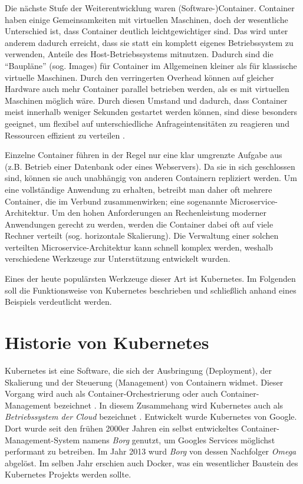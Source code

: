 \documentclass[11pt,a4paper]{article}
\begin{document}
Die nächste Stufe der Weiterentwicklung waren (Software-)Container. Container haben einige Gemeinsamkeiten mit virtuellen Maschinen, doch der wesentliche Unterschied ist,
dass Container deutlich leichtgewichtiger sind. Das wird unter anderem dadurch erreicht, dass sie statt ein komplett eigenes Betriebssystem zu verwenden, 
Anteile des Host-Betriebssystems mitnutzen. Dadurch sind die ``Baupläne'' (sog. Images) für Container im Allgemeinen kleiner als für klassische virtuelle Maschinen.
Durch den verringerten Overhead können auf gleicher Hardware auch mehr Container parallel betrieben werden, als es mit virtuellen Maschinen möglich wäre.
Durch diesen Umstand und dadurch, dass Container meist innerhalb weniger Sekunden gestartet werden können, sind diese besonders geeignet,
um flexibel auf unterschiedliche Anfrageintensitäten zu reagieren und Ressourcen effizient zu verteilen \cite{kofler2021docker}.

Einzelne Container führen in der Regel nur eine klar umgrenzte Aufgabe aus (z.B. Betrieb einer Datenbank oder eines Webservers). Da sie in sich geschlossen sind,
können sie auch unabhängig von anderen Containern repliziert werden. Um eine vollständige Anwendung zu erhalten, betreibt man daher oft mehrere Container,
die im Verbund zusammenwirken; eine sogenannte Microservice-Architektur. Um den hohen Anforderungen an Rechenleistung moderner Anwendungen gerecht zu werden,
werden die Container dabei oft auf viele Rechner verteilt (sog. horizontale Skalierung). %
Die Verwaltung einer solchen verteilten Microservice-Architektur kann schnell komplex werden, weshalb verschiedene Werkzeuge zur Unterstützung entwickelt wurden.

Eines der heute populärsten Werkzeuge dieser Art ist Kubernetes. Im Folgenden soll die Funktionsweise von Kubernetes beschrieben und schließlich anhand eines Beispiels 
verdeutlicht werden.

\section{Historie von Kubernetes}
Kubernetes ist eine Software, die sich der Ausbringung (Deployment), der Skalierung und der Steuerung (Management) von Containern widmet.
Dieser Vorgang wird auch als Container-Orchestrierung oder auch Container-Management bezeichnet \cite{Bisong2019}.
In diesem Zusammehang wird Kubernetes auch als \emph{Betriebssystem der Cloud} bezeichnet \cite{Schmeling_Dargatz_2022}. 
Entwickelt wurde Kubernetes von Google. Dort wurde seit den frühen 2000er Jahren ein selbst entwickeltes Container-Management-System namens \emph{Borg} genutzt,
um Googles Services möglichst performant zu betreiben. 
Im Jahr 2013 wurd \emph{Borg} von dessen Nachfolger \emph{Omega} abgelöst. Im selben Jahr erschien auch Docker, was ein wesentlicher Baustein des Kubernetes 
Projekts werden sollte.
\end{document}
